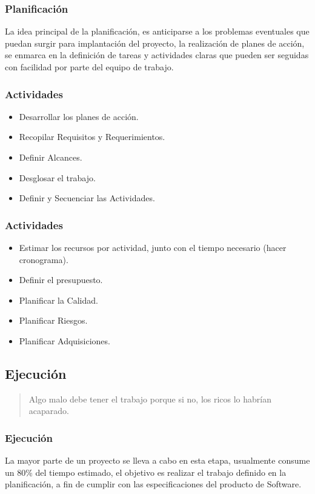 \documentclass[12pt]{beamer}
\begin{document}
\begin{frame}
 \frametitle{Planificación}
La idea principal de la planificación, es anticiparse a los problemas eventuales que puedan surgir para
implantación del proyecto, la realización de planes de acción, se enmarca en la
definición de tareas y actividades claras que pueden ser seguidas con facilidad por
parte del equipo de trabajo.
\end{frame}


\begin{frame}
 \frametitle{Actividades}
 \begin{itemize}
  \item<1-> Desarrollar los planes de acción.
  \item<2-> Recopilar Requisitos y Requerimientos.
  \item<3-> Definir Alcances.
  \item<4-> Desglosar el trabajo.
  \item<5-> Definir y Secuenciar las Actividades.
 \end{itemize}
\end{frame}


\begin{frame}
 \frametitle{Actividades}
 \begin{itemize}
  \item<1-> Estimar los recursos por actividad, junto con el tiempo necesario (hacer cronograma).
  \item<2-> Definir el presupuesto.
  \item<3-> Planificar la Calidad.
  \item<4-> Planificar Riesgos.
  \item<5-> Planificar Adquisiciones.
 \end{itemize}
\end{frame}


\subsection{Ejecución}


\begin{frame}
 \begin{quote}
 Algo malo debe tener el trabajo porque si no, los ricos lo habrían acaparado.
 \newline
 \newline
 \end{quote}
\end{frame}


\begin{frame}
 \frametitle{Ejecución}
 La mayor parte de un proyecto se lleva a cabo en esta etapa, usualmente consume un
80\% del tiempo estimado, el objetivo es realizar el trabajo definido en la
planificación, a fin de cumplir con las especificaciones del producto de Software.
\end{frame}
\end{document}

